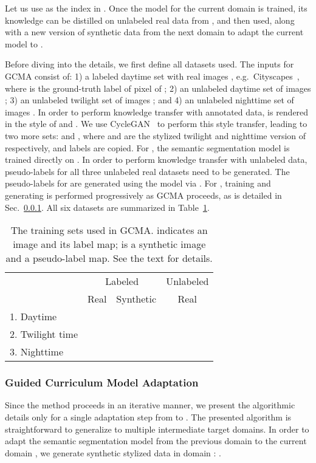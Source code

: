 \documentclass[10pt,twocolumn,letterpaper]{article}
\begin{document}
Let us use  as the index in . 
Once the model for the current domain  is trained, its knowledge can be distilled on unlabeled real data from , and then used, along with a new version of synthetic data from the next domain  to adapt the current model to .

Before diving into the details, we first define all datasets used. 
The inputs for GCMA consist of: 1) a labeled daytime set with  real images , e.g.\ Cityscapes~\cite{Cityscapes}, where  is the ground-truth label of pixel  of ; 2) an unlabeled daytime set of  images ; 3) an unlabeled twilight set of  images ; and 4) an unlabeled nighttime set of  images . In order to perform knowledge transfer with annotated data,  is rendered in the style of  and . We use CycleGAN~\cite{cycleGAN} to perform this style transfer, leading to two more sets:  and , where  and  are the stylized twilight and nighttime version of  respectively, and labels are copied. 
For , the semantic segmentation model  is trained directly on .
In order to perform knowledge transfer with unlabeled data, pseudo-labels for all three unlabeled real datasets need to be generated. The pseudo-labels for  are generated using the model  via . 
For , training  and generating  is performed progressively as GCMA proceeds, as is detailed in Sec.~\ref{sec:gcma:learning}. All six datasets are summarized in Table~\ref{tab:GCMA:notations}.

\setlength{\tabcolsep}{1pt}
\begin{table}
\caption{The training sets used in GCMA.  indicates an image and  its label map;  is a synthetic image and  a pseudo-label map. See the text for details.}
    \label{tab:GCMA:notations}
    \centering
    \footnotesize
    \begin{tabular}{lccc}
 \toprule
&  \multicolumn{2}{c}{Labeled}  & Unlabeled   \\
 & Real & Synthetic & Real  \\
 1. Daytime &  & &    \\
 2. Twilight time & &  &     \\
 3. Nighttime & &  &   \\ 
 \bottomrule
\end{tabular}
\end{table}

\subsubsection{Guided Curriculum Model Adaptation} 
\label{sec:gcma:learning}
Since the method proceeds in an iterative manner, we present the algorithmic details only for a single adaptation step from  to . The presented algorithm is straightforward to generalize to multiple intermediate target domains.
In order to adapt the semantic segmentation model  from the previous domain  to the current domain , we generate synthetic stylized data in domain : .   
\end{document}
